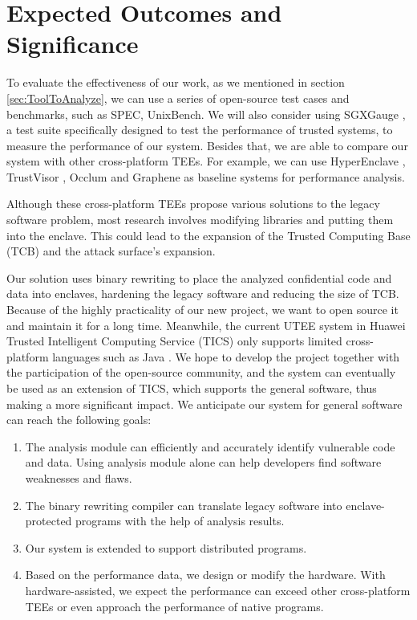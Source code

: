 \section{Expected Outcomes and Significance}
To evaluate the effectiveness of our work, as we mentioned in section
\ref{sec:ToolToAnalyze}, we can use a series of open-source test cases and benchmarks,
such as SPEC, UnixBench.
We will also consider using SGXGauge \cite{Kumar2022ACB}, a test suite specifically
designed to test the performance of trusted systems, to measure the performance
of our system.
Besides that, we are able to compare our system with other cross-platform TEEs.
For example, we can use HyperEnclave \cite{Jia2022HyperEnclaveAO}, TrustVisor
\cite{McCune2010TrustVisorET}, Occlum \cite{Shen2020OcclumSA} and Graphene
\cite{Tsai2017GrapheneSGXAP} as baseline systems for performance analysis.

Although these cross-platform TEEs propose various solutions to the legacy
software problem, most research involves modifying libraries and putting
them into the enclave.
This could lead to the expansion of the Trusted Computing Base (TCB)
and the attack surface's expansion.

Our solution uses binary rewriting to place the analyzed confidential code and data
into enclaves, hardening the legacy software and reducing the size of TCB.
Because of the highly practicality of our new project, we want to open source it and
maintain it for a long time. 
Meanwhile, the current UTEE system in Huawei Trusted Intelligent Computing Service (TICS)
only supports limited cross-platform languages such as Java \cite{Jiang2020UranusSE}.
We hope to develop the project together with the participation of the open-source
community, and the system can eventually be used as an extension of TICS, which supports
the general software, thus making a more significant impact.
We anticipate our system for general software can reach the following goals:
\begin{enumerate}[(1)]
    \item The analysis module can efficiently and accurately identify vulnerable code and data.
    Using analysis module alone can help developers find software weaknesses and flaws.
    \item The binary rewriting compiler can translate legacy software into enclave-protected programs
    with the help of analysis results.
    \item Our system is extended to support distributed programs.
    \item Based on the performance data, we design or modify the hardware.
    With hardware-assisted, we expect the performance can exceed other cross-platform TEEs
    or even approach the performance of native programs.
\end{enumerate}